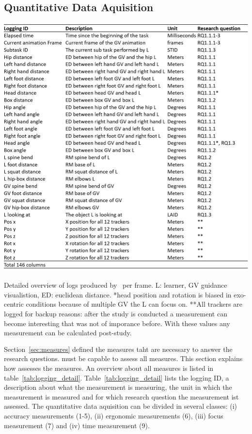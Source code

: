 \subsection{Quantitative Data Aquisition}
\label{sec:logging}
\begin{table}[H]
	\centering
	\includegraphics[width=\textwidth]{figures/logging_detail.png}
	\caption[logging detail]{Detailed overview of logs produced by \exgo\ per frame. L: learner, GV guidance visualistion, ED: euclidean distance. *head position and rotation is biased in exo-centric conditions because of multiple GV the L can focus on. **All trackers are logged for backup reasons: after the study is conducted a measurement can become interesting that was not of imporance before. With these values any measurement can be calculated post-study.}
	\label{fig:logging_detail}
\end{table}


Section~\ref{sec:measures} defined the measures taht are necessary to answer the research questions. \exgo must be capable to assess all measures. This section explains how \exgo assesses the measures. An overview about all measures is listed in table~\ref{tab:logging_detail}. Table~\ref{tab:logging_detail} lists the logging ID, a description about what the measurement is measuring, the unit in which the measurement is measured and for which research question the measurement ist assessed. The quantitative data aquisition can be divided in several classes: (i) accuracy measurements (1-5), (ii) ergonomic measurements (6), (iii) focus measurement (7) and (iv) time measurement (9). 


